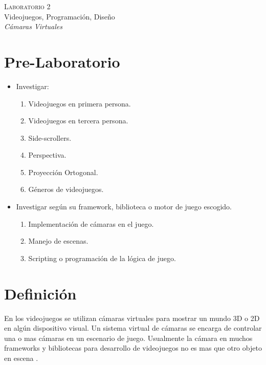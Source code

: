 \begin{center}
\textsc{\Large Laboratorio 2}~\\
{\large Videojuegos, Programación, Diseño}~\\
\emph{Cámaras Virtuales}
\end{center}

\section{Pre-Laboratorio}
\begin{itemize}
\item Investigar:
\begin{enumerate}
  \item Videojuegos en primera persona.
  \item Videojuegos en tercera persona.
  \item Side-scrollers.
  \item Perspectiva.
  \item Proyección Ortogonal.
  \item Géneros de videojuegos.
\end{enumerate}
\item Investigar según su framework, biblioteca o motor de juego escogido.
\begin{enumerate}
	\item Implementación de cámaras en el juego.
	\item Manejo de escenas.
	\item Scripting o programación de la lógica de juego.
\end{enumerate}
\end{itemize}
\section{Definición}
En los videojuegos se utilizan cámaras virtuales para mostrar un mundo 3D o 2D en algún dispositivo visual. Un sistema virtual de cámaras se encarga de controlar una o mas cámaras en un escenario de juego. Usualmente la cámara en muchos frameworks y bibliotecas para desarrollo de videojuegos no es mas que otro objeto en escena \cite{fund_gamedesign}.
